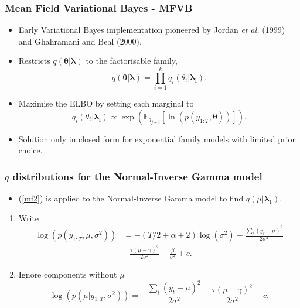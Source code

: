 \documentclass{beamer}\usepackage[]{graphicx}\usepackage[]{color}
\newcounter{saveenumi}
\newcommand{\seti}{\setcounter{saveenumi}{\value{enumi}}}
\begin{document}
\begin{frame}
\frametitle{Mean Field Variational Bayes - MFVB}
\begin{itemize}
\item Early Variational Bayes implementation pioneered by Jordan \textit{et al.} (1999) and Ghahramani and Beal (2000).
\item Restricts $q(\boldsymbol{\theta} | \boldsymbol{\lambda})$ to the factorisable family,
\begin{equation}
\label{mf1}
q(\boldsymbol{\theta} | \boldsymbol{\lambda}) = \prod_{i=1}^k q_i(\theta_i | \boldsymbol{\lambda_i}).
\end{equation}
\item Maximise the ELBO by setting each marginal to
\begin{equation}
\label{mf2}
q_i(\theta_i |\boldsymbol{\lambda_i}) \propto\exp( \mathbb{E}_{q_{j \neq i}}[\ln(p(y_{1:T},\boldsymbol{\theta}))]).
\end{equation}
\item Solution only in closed form for exponential family models with limited prior choice.
\end{itemize}
\end{frame}


\begin{frame}
\frametitle{$q$ distributions for the Normal-Inverse Gamma model}
\begin{itemize}
\item (\ref{mf2}) is applied to the Normal-Inverse Gamma model to find $q(\mu | \boldsymbol{\lambda}_1)$.
\end{itemize}
\begin{enumerate}
\item Write 
\begin{align}
\log(p(y_{1:T}, \mu, \sigma^2)) &= -(T/2 + \alpha + 2)\log(\sigma^2) - \frac{\sum_{t}(y_t - \mu)^2}{2\sigma^2} \nonumber \\
&- \frac{\tau(\mu - \gamma)^2}{2\sigma^2} - \frac{\beta}{\sigma^2} + c. \nonumber 
\end{align}
\item Ignore components without $\mu$
\begin{equation}
\log(p(\mu | y_{1:T}, \sigma^2)) = - \frac{\sum_{t}(y_t - \mu)^2}{2\sigma^2} - \frac{\tau(\mu - \gamma)^2}{2\sigma^2} + c. \nonumber
\end{equation}
\seti
\end{enumerate}
\end{frame}
\end{document}
